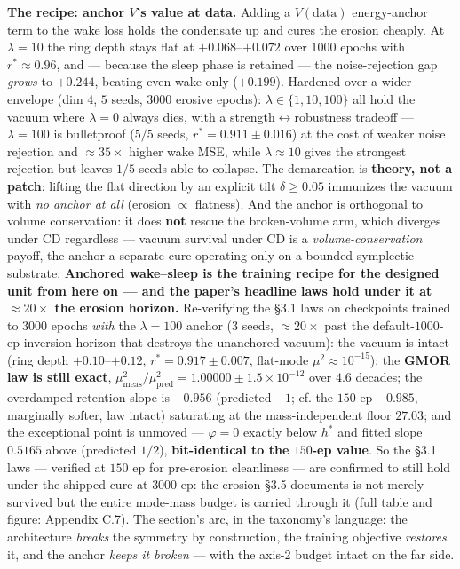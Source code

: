 \documentclass[10pt]{article}
\begin{document}
\textbf{The recipe: anchor $V$'s value at data.} Adding a $V(\text{data})$ energy-anchor term to the wake loss holds the condensate up and cures the erosion cheaply. At $\lambda=10$ the ring depth stays flat at $+0.068$--$+0.072$ over $1000$ epochs with $r^*\approx0.96$, and --- because the sleep phase is retained --- the noise-rejection gap \emph{grows} to $+0.244$, beating even wake-only ($+0.199$). Hardened over a wider envelope (dim $4$, $5$ seeds, $3000$ erosive epochs): $\lambda\in\{1,10,100\}$ all hold the vacuum where $\lambda=0$ always dies, with a strength$\leftrightarrow$robustness tradeoff --- $\lambda=100$ is bulletproof ($5/5$ seeds, $r^*=0.911\pm0.016$) at the cost of weaker noise rejection and $\approx35\times$ higher wake MSE, while $\lambda\approx10$ gives the strongest rejection but leaves $1/5$ seeds able to collapse. The demarcation is \textbf{theory, not a patch}: lifting the flat direction by an explicit tilt $\delta\ge0.05$ immunizes the vacuum with \emph{no anchor at all} (erosion $\propto$ flatness). And the anchor is orthogonal to volume conservation: it does \textbf{not} rescue the broken-volume arm, which diverges under CD regardless --- vacuum survival under CD is a \emph{volume-conservation} payoff, the anchor a separate cure operating only on a bounded symplectic substrate. \textbf{Anchored wake--sleep is the training recipe for the designed unit from here on --- and the paper's headline laws hold under it at $\approx20\times$ the erosion horizon.} Re-verifying the \S3.1 laws on checkpoints trained to $3000$ epochs \emph{with} the $\lambda=100$ anchor ($3$ seeds, $\approx20\times$ past the default-$1000$-ep inversion horizon that destroys the unanchored vacuum): the vacuum is intact (ring depth $+0.10$--$+0.12$, $r^*=0.917\pm0.007$, flat-mode $\mu^2\approx10^{-15}$); the \textbf{GMOR law is still exact}, $\mu^2_{\mathrm{meas}}/\mu^2_{\mathrm{pred}}=1.00000\pm1.5\!\times\!10^{-12}$ over $4.6$ decades; the overdamped retention slope is $-0.956$ (predicted $-1$; cf. the $150$-ep $-0.985$, marginally softer, law intact) saturating at the mass-independent floor $27.03$; and the exceptional point is unmoved --- $\varphi=0$ exactly below $h^*$ and fitted slope $0.5165$ above (predicted $1/2$), \textbf{bit-identical to the $150$-ep value}. So the \S3.1 laws --- verified at $150$ ep for pre-erosion cleanliness --- are confirmed to still hold under the shipped cure at $3000$ ep: the erosion \S3.5 documents is not merely survived but the entire mode-mass budget is carried through it (full table and figure: Appendix C.7). The section's arc, in the taxonomy's language: the architecture \emph{breaks} the symmetry by construction, the training objective \emph{restores} it, and the anchor \emph{keeps it broken} --- with the axis-2 budget intact on the far side.
\end{document}
